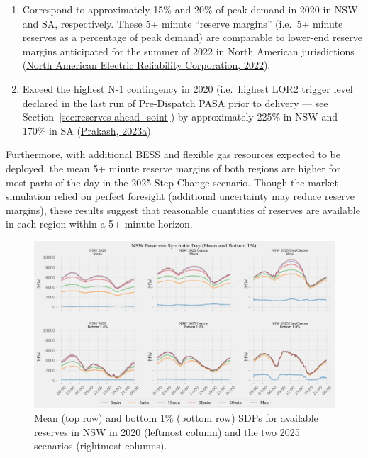 \documentclass[12pt,a4paper,]{report}
\providecommand{\tightlist}{%
  \setlength{\itemsep}{0pt}\setlength{\parskip}{0pt}}
\begin{document}
\begin{enumerate}
\def\labelenumi{\arabic{enumi}.}
\tightlist
\item
  Correspond to approximately 15\% and 20\% of peak demand in 2020 in
  NSW and SA, respectively. These 5+ minute ``reserve margins'' (i.e.~5+
  minute reserves as a percentage of peak demand) are comparable to
  lower-end reserve margins anticipated for the summer of 2022 in North
  American jurisdictions
  (\protect\hyperlink{ref-northamericanelectricreliabilitycorporation2022SummerReliability2022}{North
  American Electric Reliability Corporation, 2022}).
\item
  Exceed the highest N-1 contingency in 2020 (i.e.~highest LOR2 trigger
  level declared in the last run of Pre-Dispatch PASA prior to delivery
  --- see Section~\ref{sec:reserves-ahead_soint}) by approximately 225\%
  in NSW and 170\% in SA
  (\protect\hyperlink{ref-prakashNEMSEER2023}{Prakash, 2023a}).
\end{enumerate}

Furthermore, with additional BESS and flexible gas resources expected to
be deployed, the mean 5+ minute reserve margins of both regions are
higher for most parts of the day in the 2025 Step Change scenario.
Though the market simulation relied on perfect foresight (additional
uncertainty may reduce reserve margins), these results suggest that
reasonable quantities of reserves are available in each region within a
5+ minute horizon.

\begin{figure}
\hypertarget{fig:nswreserves}{%
\centering
\includegraphics[width=1\textwidth,height=\textheight]{./source/figures/NSW_reserves_all_profiles_by_di.png}
\caption[NSW available reserves SDPs]{Mean (top row) and bottom 1\%
(bottom row) SDPs for available reserves in NSW in 2020 (leftmost
column) and the two 2025 scenarios (rightmost
columns).}\label{fig:nswreserves}
}
\end{figure}
\end{document}
